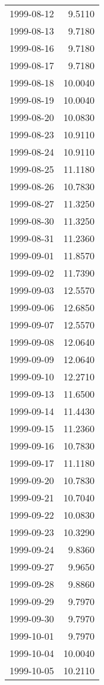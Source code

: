 \begin{tabular}{lr}
1999-08-12 &      9.5110 \\
1999-08-13 &      9.7180 \\
1999-08-16 &      9.7180 \\
1999-08-17 &      9.7180 \\
1999-08-18 &     10.0040 \\
1999-08-19 &     10.0040 \\
1999-08-20 &     10.0830 \\
1999-08-23 &     10.9110 \\
1999-08-24 &     10.9110 \\
1999-08-25 &     11.1180 \\
1999-08-26 &     10.7830 \\
1999-08-27 &     11.3250 \\
1999-08-30 &     11.3250 \\
1999-08-31 &     11.2360 \\
1999-09-01 &     11.8570 \\
1999-09-02 &     11.7390 \\
1999-09-03 &     12.5570 \\
1999-09-06 &     12.6850 \\
1999-09-07 &     12.5570 \\
1999-09-08 &     12.0640 \\
1999-09-09 &     12.0640 \\
1999-09-10 &     12.2710 \\
1999-09-13 &     11.6500 \\
1999-09-14 &     11.4430 \\
1999-09-15 &     11.2360 \\
1999-09-16 &     10.7830 \\
1999-09-17 &     11.1180 \\
1999-09-20 &     10.7830 \\
1999-09-21 &     10.7040 \\
1999-09-22 &     10.0830 \\
1999-09-23 &     10.3290 \\
1999-09-24 &      9.8360 \\
1999-09-27 &      9.9650 \\
1999-09-28 &      9.8860 \\
1999-09-29 &      9.7970 \\
1999-09-30 &      9.7970 \\
1999-10-01 &      9.7970 \\
1999-10-04 &     10.0040 \\
1999-10-05 &     10.2110 \\

\end{tabular}
